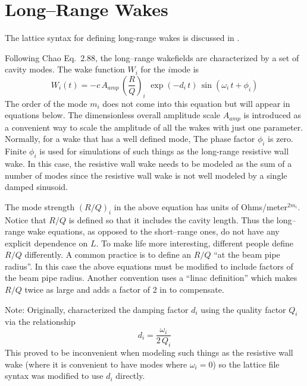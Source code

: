 \section{Long--Range Wakes}
\label{s:lr.wake.eq}

The lattice syntax for defining long-range wakes is discussed in .

Following Chao\cite{b:chao} Eq.~2.88, the long--range wakefields are characterized by a set of
cavity modes. The wake function $W_i$ for the $i$\Th mode is
\begin{equation}
  W_i(t) = -c \, A_{amp} \, \left( \frac{R}{Q} \right)_i \,\,
  \exp(-d_i \, t) \, \sin (\omega_i \, t + \phi_i)
  \label{wcrq}
\end{equation}
The order of the mode $m_i$ does not come into this equation but will appear in equations below.
The dimensionless overall amplitude scale $A_{amp}$ is introduced as a convenient way to scale the
amplitude of all the wakes with just one parameter. Normally, for a wake that has a well defined
mode, The phase factor $\phi_i$ is zero. Finite $\phi_i$ is used for simulations of such things as
the long-range resistive wall wake. In this case, the resistive wall wake needs to be modeled as the
sum of a number of modes since the resistive wall wake is not well modeled by a single damped
sinusoid.

The mode strength $(R/Q)_i$ in the above equation has units of Ohms/meter$^{2m_i}$. Notice that
$R/Q$ is defined so that it includes the cavity length. Thus the long--range wake equations, as
opposed to the short--range ones, do not have any explicit dependence on $L$. To make life more
interesting, different people define $R/Q$ differently. A common practice is to define an $R/Q$ ``at
the beam pipe radius''. In this case the above equations must be modified to include factors of the
beam pipe radius. Another convention uses a ``linac definition'' which makes $R/Q$ twice as large
and adds a factor of 2 in  to compensate.

Note: Originally, \bmad characterized the damping factor $d_i$ using the quality factor $Q_i$ via the
relationship
\begin{equation}
  d_i = \frac{\omega_i}{2 \, Q_i}
  \label{do2q}
\end{equation}
This proved to be inconvenient when modeling such things as the resistive wall wake (where it is convenient
to have modes where $\omega_i = 0$) so the lattice file syntax was modified to use $d_i$ directly.

